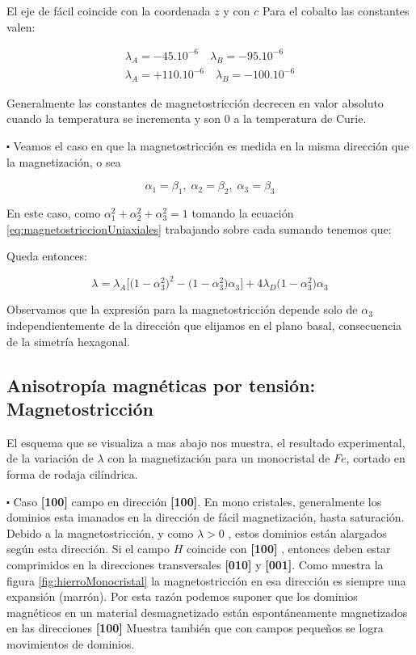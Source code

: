 El eje de fácil coincide con la coordenada $z$ y con $c$ Para el cobalto las constantes valen:

\begin{equation}
\begin{aligned}
	\lambda_{A} = -45.10^{-6} \quad \lambda_{B} = -95.10^{-6} \\
	\lambda_{A} = +110.10^{-6} \quad \lambda_{B} = -100.10^{-6} 
\end{aligned}
\end{equation}

Generalmente las constantes de magnetostricción decrecen en valor absoluto cuando la temperatura se incrementa y son $0$ a la temperatura de Curie.

$\centerdot$ Veamos el caso en que la magnetostricción es medida en la misma dirección que la magnetización, o sea



\begin{equation}
	\alpha_{1}= \beta_{1}, \; \alpha_{2}= \beta_{2}, \; \alpha_{3}= \beta_{3}
\end{equation}

En este caso, como ${\alpha_{1}^{2}+\alpha_{2}^{2}+\alpha_{3}^{2}=1}$ tomando la ecuación \ref{eq:magnetostriccionUniaxiales} trabajando sobre cada sumando tenemos que:

Queda entonces:

\begin{equation}
	\lambda = \lambda_{A} \big[\big(1-\alpha_{3}^{2}\big)^{2}-\big(1-\alpha_{3}^{2}\big)\alpha_{3} \big] + 4\lambda_{D} \big(1-\alpha_{3}^{2}\big)\alpha_{3}
\end{equation}

Observamos que la expresión para la magnetostricción depende solo de $\alpha_{3}$ independientemente de la dirección que elijamos en el plano basal, consecuencia de la simetría hexagonal.

\subsection{Anisotropía magnéticas por tensión: Magnetostricción}

El esquema que se visualiza a mas abajo nos muestra, el resultado experimental, de la variación de $\lambda$ con la magnetización para un monocristal de $Fe$, cortado en forma de rodaja cilíndrica.

$\centerdot$ Caso \textbf{[100]} campo en dirección \textbf{[100]}. En mono cristales, generalmente los dominios esta imanados en la dirección de fácil magnetización, hasta saturación. Debido a la magnetostricción, y como $\lambda>0$ , estos dominios están alargados según esta dirección. Si el campo $H$ coincide con \textbf{[100]} , entonces deben estar comprimidos en la direcciones transversales \textbf{[010]} y \textbf{[001]}. Como muestra la figura \ref{fig:hierroMonocristal} la magnetostricción en esa dirección es siempre una expansión (marrón). Por esta razón podemos suponer que los dominios magnéticos en un material desmagnetizado están espontáneamente magnetizados en las direcciones \textbf{[100]} Muestra también que con campos pequeños se logra movimientos de dominios.



